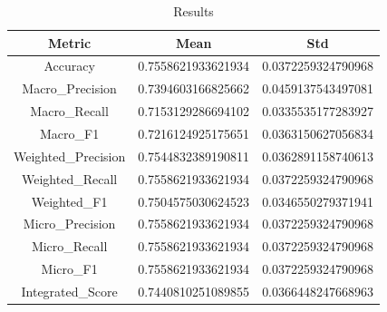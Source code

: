 \begin{table}[htbp]
\centering
\caption{Results}
\label{tab:csv}
\small
\setlength{\tabcolsep}{4pt}
\begin{tabular}{|c|c|c|}
\hline
Metric & Mean & Std \\
\hline
Accuracy & 0.7558621933621934 & 0.0372259324790968 \\
Macro_Precision & 0.7394603166825662 & 0.0459137543497081 \\
Macro_Recall & 0.7153129286694102 & 0.0335535177283927 \\
Macro_F1 & 0.7216124925175651 & 0.0363150627056834 \\
Weighted_Precision & 0.7544832389190811 & 0.0362891158740613 \\
Weighted_Recall & 0.7558621933621934 & 0.0372259324790968 \\
Weighted_F1 & 0.7504575030624523 & 0.0346550279371941 \\
Micro_Precision & 0.7558621933621934 & 0.0372259324790968 \\
Micro_Recall & 0.7558621933621934 & 0.0372259324790968 \\
Micro_F1 & 0.7558621933621934 & 0.0372259324790968 \\
Integrated_Score & 0.7440810251089855 & 0.0366448247668963 \\
\hline
\end{tabular}
\end{table}